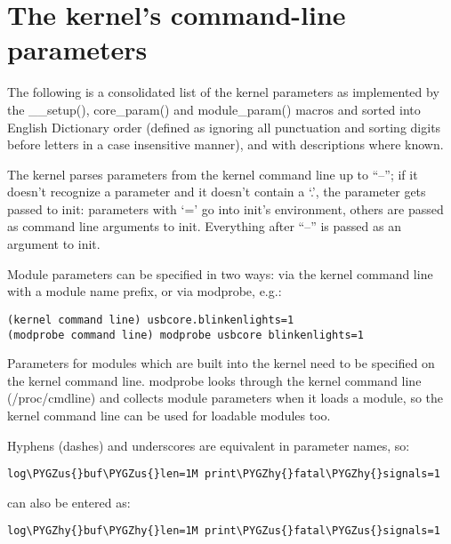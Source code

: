 \documentclass[a4paper,8pt,english]{sphinxmanual}
\def\PYGZus{\char`\_}
\def\PYGZhy{\char`\-}
\begin{document}
\chapter{The kernel's command-line parameters}
\label{admin-guide/kernel-parameters:the-kernel-s-command-line-parameters}\label{admin-guide/kernel-parameters:kernelparameters}\label{admin-guide/kernel-parameters::doc}
The following is a consolidated list of the kernel parameters as
implemented by the \_\_setup(), core\_param() and module\_param() macros
and sorted into English Dictionary order (defined as ignoring all
punctuation and sorting digits before letters in a case insensitive
manner), and with descriptions where known.

The kernel parses parameters from the kernel command line up to ``--'';
if it doesn't recognize a parameter and it doesn't contain a `.', the
parameter gets passed to init: parameters with `=' go into init's
environment, others are passed as command line arguments to init.
Everything after ``--'' is passed as an argument to init.

Module parameters can be specified in two ways: via the kernel command
line with a module name prefix, or via modprobe, e.g.:

\begin{Verbatim}[commandchars=\\\{\}]
(kernel command line) usbcore.blinkenlights=1
(modprobe command line) modprobe usbcore blinkenlights=1
\end{Verbatim}

Parameters for modules which are built into the kernel need to be
specified on the kernel command line.  modprobe looks through the
kernel command line (/proc/cmdline) and collects module parameters
when it loads a module, so the kernel command line can be used for
loadable modules too.

Hyphens (dashes) and underscores are equivalent in parameter names, so:

\begin{Verbatim}[commandchars=\\\{\}]
log\PYGZus{}buf\PYGZus{}len=1M print\PYGZhy{}fatal\PYGZhy{}signals=1
\end{Verbatim}

can also be entered as:

\begin{Verbatim}[commandchars=\\\{\}]
log\PYGZhy{}buf\PYGZhy{}len=1M print\PYGZus{}fatal\PYGZus{}signals=1
\end{Verbatim}
\end{document}
